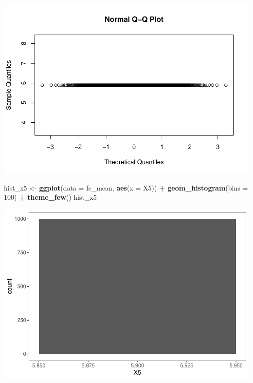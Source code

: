 \documentclass[]{article}
\newenvironment{Shaded}{\begin{snugshade}}{\end{snugshade}}
\newcommand{\DataTypeTok}[1]{\textcolor[rgb]{0.13,0.29,0.53}{#1}}
\newcommand{\DecValTok}[1]{\textcolor[rgb]{0.00,0.00,0.81}{#1}}
\newcommand{\KeywordTok}[1]{\textcolor[rgb]{0.13,0.29,0.53}{\textbf{#1}}}
\newcommand{\NormalTok}[1]{#1}
\newcommand{\OperatorTok}[1]{\textcolor[rgb]{0.81,0.36,0.00}{\textbf{#1}}}
\newcommand{\StringTok}[1]{\textcolor[rgb]{0.31,0.60,0.02}{#1}}
\begin{document}
\includegraphics{Econo2_P4_files/figure-latex/mean ic-8.pdf}

\begin{Shaded}
\begin{Highlighting}[]
\NormalTok{hist_x5 <-}\StringTok{ }\KeywordTok{ggplot}\NormalTok{(}\DataTypeTok{data =}\NormalTok{ fc_mean, }\KeywordTok{aes}\NormalTok{(}\DataTypeTok{x =}\NormalTok{ X5)) }\OperatorTok{+}\StringTok{ }\KeywordTok{geom_histogram}\NormalTok{(}\DataTypeTok{bins =} \DecValTok{100}\NormalTok{) }\OperatorTok{+}\StringTok{ }\KeywordTok{theme_few}\NormalTok{() }
\NormalTok{hist_x5}
\end{Highlighting}
\end{Shaded}

\includegraphics{Econo2_P4_files/figure-latex/mean ic-9.pdf}

\begin{Shaded}
\end{Shaded}
\end{document}
